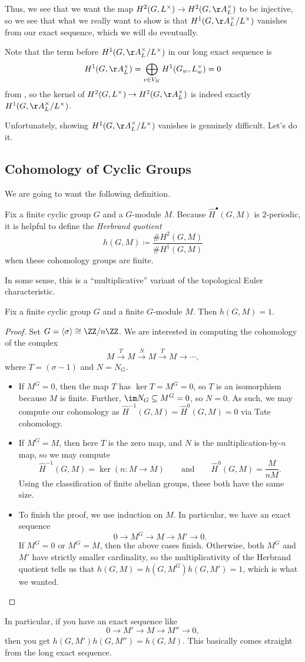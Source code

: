 \documentclass[../notes.tex]{subfiles}
\begin{document}
Thus, we see that we want the map $H^2(G,L^\times)\to H^2(G,\AA_L^\times)$ to be injective, so we see that what we really want to show is that $H^1(G,\AA_L^\times/L^\times)$ vanishes from our exact sequence, which we will do eventually.
\begin{remark}
	Note that the term before $H^1(G,\AA_L^\times/L^\times)$ in our long exact sequence is
	\[H^1(G,\AA_L^\times)=\bigoplus_{v\in V_K}H^1(G_w,L_w^\times)=0\]
	from , so the kernel of $H^2(G,L^\times)\to H^2(G,\AA_L^\times)$ is indeed exactly $H^1(G,\AA_L^\times/L^\times)$.
\end{remark}
Unfortunately, showing $H^1(G,\AA_L^\times/L^\times)$ vanishes is genuinely difficult. Let's do it.

\subsection{Cohomology of Cyclic Groups}
We are going to want the following definition.
\begin{definition}
	Fix a finite cyclic group $G$ and a $G$-module $M$. Because $\widehat H^\bullet(G,M)$ is $2$-periodic, it is helpful to define the \textit{Herbrand quotient}
	\[h(G,M)\coloneqq\frac{\#H^2(G,M)}{\#H^1(G,M)}\]
	when these cohomology groups are finite.
\end{definition}
\begin{remark}
	In some sense, this is a ``multiplicative'' variant of the topological Euler characteristic.
\end{remark}
\begin{lemma} \label{lem:finite-herbrand}
	Fix a finite cyclic group $G$ and a finite $G$-module $M$. Then $h(G,M)=1$.
\end{lemma}
\begin{proof}
	Set $G=\langle\sigma\rangle\cong\ZZ/n\ZZ$. We are interested in computing the cohomology of the complex
	\[M\xrightarrow{T}M\xrightarrow{N}M\xrightarrow{T}M\to\cdots,\]
	where $T=(\sigma-1)$ and $N=N_G$.
	\begin{itemize}
		\item If $M^G=0$, then the map $T$ has $\ker T=M^G=0$, so $T$ is an isomorphism because $M$ is finite. Further, $\im N_G\subseteq M^G=0$, so $N=0$. As such, we may compute our cohomology as $\widehat H^{-1}(G,M)=\widehat H^0(G,M)=0$ via Tate cohomology.
		\item If $M^G=M$, then here $T$ is the zero map, and $N$ is the multiplication-by-$n$ map, so we may compute
		\[\widehat H^{-1}(G,M)=\ker(n\colon M\to M)\qquad\text{and}\qquad\widehat H^0(G,M)=\frac{M}{nM}.\]
		Using the classification of finite abelian groups, these both have the same size.
		\item To finish the proof, we use induction on $M$. In particular, we have an exact sequence
		\[0\to M^G\to M\to M'\to0.\]
		If $M^G=0$ or $M^G=M$, then the above cases finish. Otherwise, both $M^G$ and $M'$ have strictly smaller cardinality, so the multiplicativity of the Herbrand quotient tells us that $h(G,M)=h(G,M^G)h(G,M')=1$, which is what we wanted.
		\qedhere
	\end{itemize}
\end{proof}
\begin{remark}
	In particular, if you have an exact sequence like
	\[0\to M'\to M\to M''\to0,\]
	then you get $h(G,M')h(G,M'')=h(G,M)$. This basically comes straight from the long exact sequence.
\end{remark}
\end{document}
